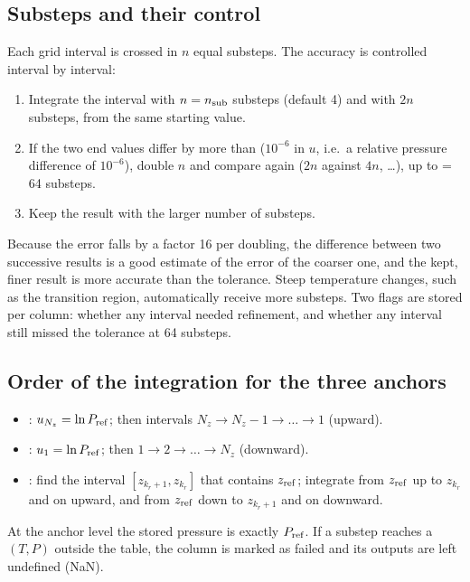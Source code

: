 \subsection{Substeps and their control}
Each grid interval is crossed in $n$ equal substeps. The accuracy is controlled interval by interval:
\begin{enumerate}
\item Integrate the interval with $n=n_{\rm sub}$ substeps (default 4) and with $2n$ substeps, from the same starting value.
\item If the two end values differ by more than  ($10^{-6}$ in $u$, i.e.\ a relative pressure difference of
$10^{-6}$), double $n$ and compare again ($2n$ against $4n$, \dots), up to  = 64 substeps.
\item Keep the result with the larger number of substeps.
\end{enumerate}
Because the error falls by a factor 16 per doubling, the difference between two successive results is a good estimate of
the error of the coarser one, and the kept, finer result is more accurate than the tolerance. Steep temperature changes,
such as the transition region, automatically receive more substeps. Two flags are stored per column: whether any interval
needed refinement, and whether any interval still missed the tolerance at 64 substeps.

\subsection{Order of the integration for the three anchors}
\begin{itemize}
\item {}: $u_{N_z}=\ln P_{\rm ref}$; then intervals $N_z\!\to\!N_z\!-\!1\to\dots\to1$ (upward).
\item {}: $u_1=\ln P_{\rm ref}$; then $1\to2\to\dots\to N_z$ (downward).
\item {}: find the interval $[z_{k_r+1},z_{k_r}]$ that contains $z_{\rm ref}$; integrate from $z_{\rm ref}$ up to
$z_{k_r}$ and on upward, and from $z_{\rm ref}$ down to $z_{k_r+1}$ and on downward.
\end{itemize}
At the anchor level the stored pressure is exactly $P_{\rm ref}$. If a substep reaches a $(T,P)$ outside the table, the
column is marked as failed and its outputs are left undefined (NaN).

